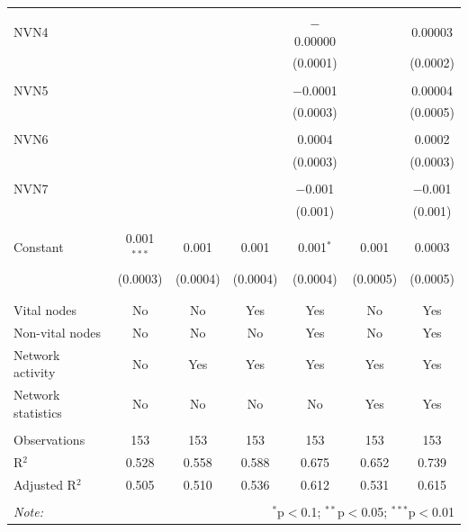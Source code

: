 \begin{table}[!htbp]
\begin{tabular}{@{\extracolsep{5pt}}lcccccc}
  & & & & & & \\ 
 NVN4 &  &  &  & $-$0.00000 &  & 0.00003 \\ 
  &  &  &  & (0.0001) &  & (0.0002) \\ 
  & & & & & & \\ 
 NVN5 &  &  &  & $-$0.0001 &  & 0.00004 \\ 
  &  &  &  & (0.0003) &  & (0.0005) \\ 
  & & & & & & \\ 
 NVN6 &  &  &  & 0.0004 &  & 0.0002 \\ 
  &  &  &  & (0.0003) &  & (0.0003) \\ 
  & & & & & & \\ 
 NVN7 &  &  &  & $-$0.001 &  & $-$0.001 \\ 
  &  &  &  & (0.001) &  & (0.001) \\ 
  & & & & & & \\ 
 Constant & 0.001$^{***}$ & 0.001 & 0.001 & 0.001$^{*}$ & 0.001 & 0.0003 \\ 
  & (0.0003) & (0.0004) & (0.0004) & (0.0004) & (0.0005) & (0.0005) \\ 
  & & & & & & \\ 
\hline \\[-1.8ex] 
Vital nodes & No & No & Yes & Yes & No & Yes \\ 
Non-vital nodes & No & No & No & Yes & No & Yes \\ 
Network activity & No & Yes & Yes & Yes & Yes & Yes \\ 
Network statistics & No & No & No & No & Yes & Yes \\ 
\hline &  &  &  &  &  &  \\ 
Observations & 153 & 153 & 153 & 153 & 153 & 153 \\ 
R$^{2}$ & 0.528 & 0.558 & 0.588 & 0.675 & 0.652 & 0.739 \\ 
Adjusted R$^{2}$ & 0.505 & 0.510 & 0.536 & 0.612 & 0.531 & 0.615 \\ 
\hline 
\hline \\[-1.8ex] 
\textit{Note:}  & \multicolumn{6}{r}{$^{*}$p$<$0.1; $^{**}$p$<$0.05; $^{***}$p$<$0.01} \\ 
\end{tabular} 
\end{table} 
